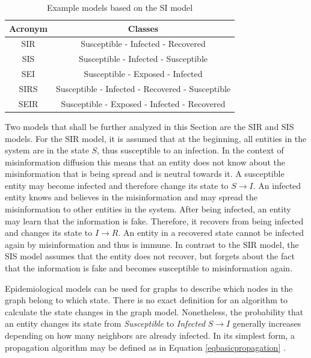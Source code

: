 \begin{table}[ht!]
    \centering
    \begin{tabular}{|c | c |} 
     \hline
     Acronym & Classes  \\ 
     \hline
     SIR & Susceptible - Infected - Recovered  \\ 
     \hline
     SIS & Susceptible - Infected - Susceptible \\
     \hline
     SEI & Susceptible - Exposed - Infected \\
     \hline
     SIRS & Susceptible - Infected - Recovered - Susceptible \\
     \hline
     SEIR & Susceptible - Exposed - Infected - Recovered \\
     \hline
    \end{tabular}
    \caption{Example models based on the SI 
    model  \cite{reviewinformationdiffusion}}
    \label{SI-table}
\end{table}

Two models that shall be further analyzed in this Section are the SIR and SIS models. 
For the SIR model, it is assumed that at the beginning, all entities in the 
system are in the state $S$, thus susceptible to an infection. In the context of 
misinformation diffusion this means that an entity does not know about the
misinformation that is being spread and is neutral towards it. A susceptible
entity may become infected and therefore change its state to $S\to I$.
An infected entity knows and believes in the misinformation and may
spread the misinformation to other entities in the system. After being infected,
an entity may learn that the information is fake. Therefore, it recovers 
from being infected and changes its state to $I\to R$. An entity in a 
recovered state cannot be infected again by misinformation and thus is immune.
In contrast to the SIR model, the SIS model assumes that
the entity does not recover,
but \glqq forgets\grqq{} about the fact that the information is fake 
and becomes susceptible to misinformation again.

Epidemiological models can be used for graphs to describe which nodes 
in the graph belong to which state.
There is no exact definition for an algorithm to calculate the state 
changes in the graph model. Nonetheless, the probability that an entity changes
its state from \textit{Susceptible} to \textit{Infected} 
$S \to I$ generally increases depending on
how many neighbors are already infected. In its simplest form, a
propagation algorithm may be defined as in Equation \ref{eqbasicpropagation} 
\cite{easypropagation}.

